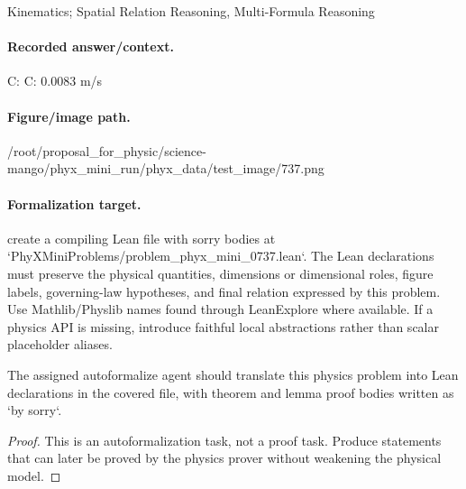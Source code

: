 Kinematics; Spatial Relation Reasoning, Multi-Formula Reasoning

\paragraph{Recorded answer/context.}
C: C: 0.0083 m/s

\paragraph{Figure/image path.}
/root/proposal\_for\_physic/science-mango/phyx\_mini\_run/phyx\_data/test\_image/737.png

\paragraph{Formalization target.}
create a compiling Lean file with sorry bodies at `PhyXMiniProblems/problem\_phyx\_mini\_0737.lean`. The Lean declarations must preserve the physical quantities, dimensions or dimensional roles, figure labels, governing-law hypotheses, and final relation expressed by this problem.
Use Mathlib/Physlib names found through LeanExplore where available. If a physics API is missing, introduce faithful local abstractions rather than scalar placeholder aliases.

\begin{theorem}
\label{thm:physics:phyx_mini_0737:target}
The assigned autoformalize agent should translate this physics problem into Lean declarations in the covered file, with theorem and lemma proof bodies written as `by sorry`.
\end{theorem}
\begin{proof}
This is an autoformalization task, not a proof task. Produce statements that can later be proved by the physics prover without weakening the physical model.
\end{proof}

